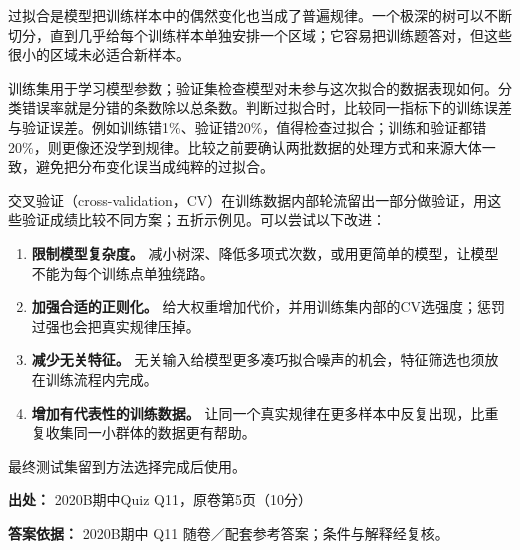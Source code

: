 过拟合是模型把训练样本中的偶然变化也当成了普遍规律。一个极深的树可以不断切分，直到几乎给每个训练样本单独安排一个区域；它容易把训练题答对，但这些很小的区域未必适合新样本。


训练集用于学习模型参数；验证集检查模型对未参与这次拟合的数据表现如何。分类错误率就是分错的条数除以总条数。判断过拟合时，比较同一指标下的训练误差与验证误差。例如训练错1\%、验证错20\%，值得检查过拟合；训练和验证都错20\%，则更像还没学到规律。比较之前要确认两批数据的处理方式和来源大体一致，避免把分布变化误当成纯粹的过拟合。


交叉验证（cross-validation，CV）在训练数据内部轮流留出一部分做验证，用这些验证成绩比较不同方案；五折示例见。可以尝试以下改进：



\begin{enumerate}[start=1]

\item \textbf{限制模型复杂度。} 减小树深、降低多项式次数，或用更简单的模型，让模型不能为每个训练点单独绕路。

\item \textbf{加强合适的正则化。} 给大权重增加代价，并用训练集内部的CV选强度；惩罚过强也会把真实规律压掉。

\item \textbf{减少无关特征。} 无关输入给模型更多凑巧拟合噪声的机会，特征筛选也须放在训练流程内完成。

\item \textbf{增加有代表性的训练数据。} 让同一个真实规律在更多样本中反复出现，比重复收集同一小群体的数据更有帮助。

\end{enumerate}


最终测试集留到方法选择完成后使用。


\textbf{出处：} 2020B期中Quiz Q11，原卷第5页（10分）


\textbf{答案依据：} 2020B期中 Q11 随卷／配套参考答案；条件与解释经复核。
